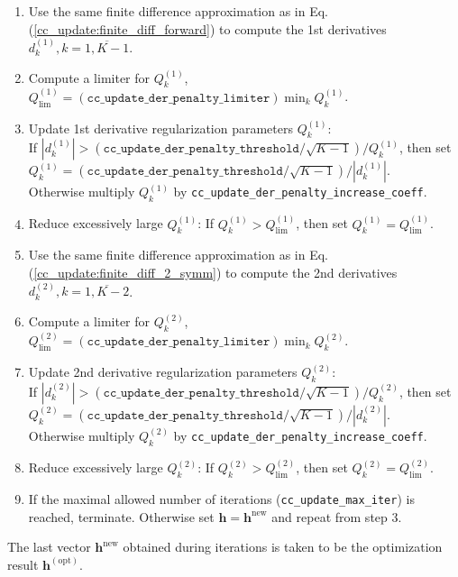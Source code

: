 \documentclass[]{article}
\begin{document}
\begin{enumerate}
    \item Use the same finite difference approximation as in Eq. (\ref{cc_update:finite_diff_forward}) to compute the 1st derivatives $d^{(1)}_k, k = \overline{1,K-1}$.

    \item Compute a limiter for $Q^{(1)}_k$,
    $Q^{(1)}_\mathrm{lim} = (\mathtt{cc\_update\_der\_penalty\_limiter}) \min_k Q^{(1)}_k$.

    \item Update 1st derivative regularization parameters $Q^{(1)}_k$:\\
    If $|d^{(1)}_k| > (\mathtt{cc\_update\_der\_penalty\_threshold} / \sqrt{K-1}) / Q^{(1)}_k$, then set\\
    $Q^{(1)}_k = (\mathtt{cc\_update\_der\_penalty\_threshold} / \sqrt{K-1}) / |d^{(1)}_k|$.\\
    Otherwise multiply $Q^{(1)}_k$ by \verb|cc_update_der_penalty_increase_coeff|.

    \item Reduce excessively large $Q^{(1)}_k$: If $Q^{(1)}_k > Q^{(1)}_\mathrm{lim}$, then set $Q^{(1)}_k = Q^{(1)}_\mathrm{lim}$.

    \item Use the same finite difference approximation as in Eq. (\ref{cc_update:finite_diff_2_symm}) to compute the 2nd derivatives $d^{(2)}_k, k = \overline{1,K-2}$.

    \item Compute a limiter for $Q^{(2)}_k$,
    $Q^{(2)}_\mathrm{lim} = (\mathtt{cc\_update\_der\_penalty\_limiter}) \min_k Q^{(2)}_k$.

    \item Update 2nd derivative regularization parameters $Q^{(2)}_k$:\\
    If $|d^{(2)}_k| > (\mathtt{cc\_update\_der\_penalty\_threshold} / \sqrt{K-1}) / Q^{(2)}_k$, then set\\
    $Q^{(2)}_k = (\mathtt{cc\_update\_der\_penalty\_threshold} / \sqrt{K-1}) / |d^{(2)}_k|$.\\
    Otherwise multiply $Q^{(2)}_k$ by \verb|cc_update_der_penalty_increase_coeff|.

    \item Reduce excessively large $Q^{(2)}_k$: If $Q^{(2)}_k > Q^{(2)}_\mathrm{lim}$, then set $Q^{(2)}_k = Q^{(2)}_\mathrm{lim}$.

    \item If the maximal allowed number of iterations (\verb|cc_update_max_iter|) is reached, terminate. Otherwise set $\mathbf{h} = \mathbf{h}^\mathrm{new}$ and repeat from step 3.
\end{enumerate}
The last vector $\mathbf{h}^\mathrm{new}$ obtained during iterations is taken to be the optimization result $\mathbf{h}^\mathrm{(opt)}$.
\end{document}
